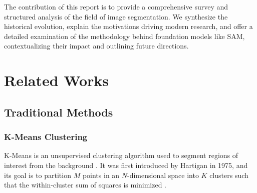 \documentclass[conference]{IEEEtran}
\begin{document}
The contribution of this report is to provide a comprehensive survey and structured analysis of the field of image segmentation. We synthesize the historical evolution, explain the motivations driving modern research, and offer a detailed examination of the methodology behind foundation models like SAM, contextualizing their impact and outlining future directions.

\section{Related Works}
\subsection{Traditional Methods}
\subsubsection{K-Means Clustering}
	K-Means is an unsupervised clustering algorithm used to segment regions of interest from the background \cite{nameirakpam2015kmeanssubtractive}. It was first introduced by Hartigan in 1975, and its goal is to partition $M$ points in an $N$-dimensional space into $K$ clusters such that the within-cluster sum of squares is minimized \cite{hartigan1979kmeans}.
	
\end{document}

